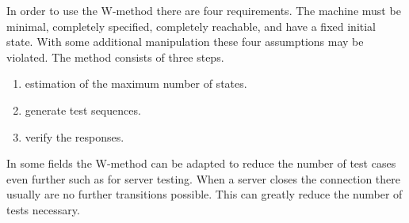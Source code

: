 \documentclass[multi,crop=false,class=article]{standalone}
\begin{document}
In order to use the W-method there are four requirements.
The machine must be minimal, completely specified, completely reachable, 
and have a fixed initial state.
With some additional manipulation these four assumptions may be violated.
The method consists of three steps.
\begin{enumerate}
\item estimation of the maximum number of states.
\item generate test sequences.
\item verify the responses.
\end{enumerate}

In some fields the W-method can be adapted to reduce the number of test
cases even further such as for server testing.
When a server closes the connection there usually are no further
transitions possible.
This can greatly reduce the number of tests necessary\cite{deRuiter15}.
\end{document}
